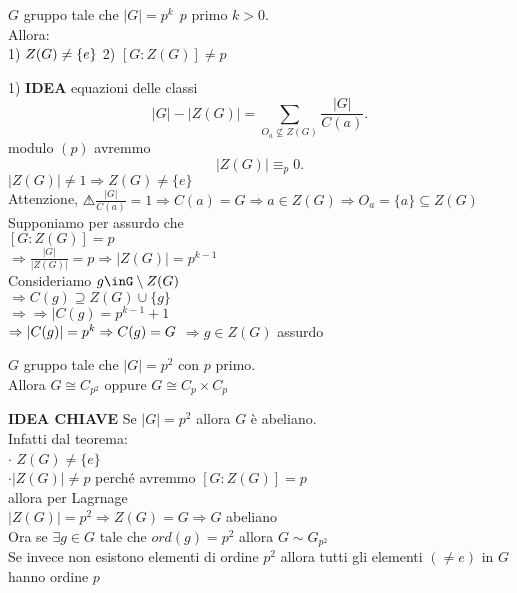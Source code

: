 \documentclass[12px]{article}
\begin{document}
{\begin{dimo}
	\end{dimo}
	\begin{teo}
		$G$ gruppo tale che $|G| = p^k \ \ p$ primo $k>0$.\\
		Allora:\\
		1) $Z(G)\neq \{e\}\\$
		2) $[G:Z(G)] \neq p$
	\end{teo}
	\begin{dimo}
		1) \textbf{IDEA} equazioni delle classi
		\[
			|G| - |Z(G)| = \sum_{O_a\not\subseteq Z(G)}\frac{|G|}{C(a)}
		.\] 
		modulo  $(p)$ avremmo
		 \[
		|Z(G)|\equiv_p 0 
		.\] 
		$|Z(G)| \neq 1 \Rightarrow Z(G) \neq \{e\}$ \\
		Attenzione, $\warning \frac {|G|}{C(a)} = 1 \Rightarrow C(a) = G \Rightarrow a\in Z(G) \Rightarrow O_a = \{a\}\subseteq Z(G)$\\
		Supponiamo per assurdo che\\
		$[G:Z(G)] = p$ \\
		$ \Rightarrow \frac{|G|}{|Z(G)|} = p \Rightarrow |Z(G)| = p^{k-1}$ \\
		Consideriamo $g\inG\setminus Z(G)$\\
		$ \Rightarrow C(g)\supseteq Z(G)\cup \{g\}$ \\
		$ \Rightarrow  \Rightarrow |C(g) = p^{k-1} + 1$ \\
		$ \Rightarrow |C(g)| = p^k \Rightarrow C(g) = G\\$ 
		$ \Rightarrow g\in Z(G)$ assurdo
	\end{dimo}
	\begin{coro}
		$G$ gruppo tale che $|G| = p^2$ con  $p$ primo.\\
		Allora $G\cong C_{p^2}$ oppure $G\cong C_p\times C_p$
	\end{coro}
	\begin{dimo}
		\textbf{IDEA CHIAVE} Se $|G| = p^2$ allora  $G$ è abeliano.\\
		Infatti dal teorema:\\
		$\cdot$ $Z(G)\neq\{e\}$\\
		$\cdot |Z(G)|\neq p$ perché avremmo $[G:Z(G)]=p$\\
		allora per Lagrnage\\
		$|Z(G)| = p^2 \Rightarrow Z(G) = G \Rightarrow  G$ abeliano\\
		Ora se $\exists g\in G$ tale che  $ord(g) = p^2$ allora  $G\sim G_{p^2}$\\
		Se invece non esistono elementi di ordine  $p^2$ allora tutti gli elementi  $(\neq e)$ in $G$ hanno ordine $p$\\

\end{dimo}}
\end{document}
